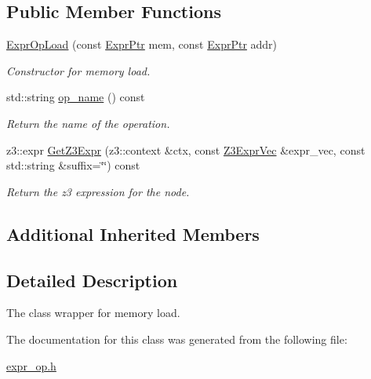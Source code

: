 \subsection*{Public Member Functions}
\begin{DoxyCompactItemize}
\item 
\mbox{\label{classilang_1_1_expr_op_load_ac7498e494eb3d11568e8ff2a7d3fc1ff}} 
\mbox{\hyperlink{classilang_1_1_expr_op_load_ac7498e494eb3d11568e8ff2a7d3fc1ff}{Expr\+Op\+Load}} (const \mbox{\hyperlink{classilang_1_1_expr_a85952b6a34620c4c8cab6bac9c9fdf8c}{Expr\+Ptr}} mem, const \mbox{\hyperlink{classilang_1_1_expr_a85952b6a34620c4c8cab6bac9c9fdf8c}{Expr\+Ptr}} addr)
\begin{DoxyCompactList}\small\item\em Constructor for memory load. \end{DoxyCompactList}\item 
\mbox{\label{classilang_1_1_expr_op_load_aa8b13ab857c69fa56660852b859d5ce4}} 
std\+::string \mbox{\hyperlink{classilang_1_1_expr_op_load_aa8b13ab857c69fa56660852b859d5ce4}{op\+\_\+name}} () const
\begin{DoxyCompactList}\small\item\em Return the name of the operation. \end{DoxyCompactList}\item 
\mbox{\label{classilang_1_1_expr_op_load_acfe4848a648ad1b1a5e7b014363e3e0e}} 
z3\+::expr \mbox{\hyperlink{classilang_1_1_expr_op_load_acfe4848a648ad1b1a5e7b014363e3e0e}{Get\+Z3\+Expr}} (z3\+::context \&ctx, const \mbox{\hyperlink{namespaceilang_adc4eee919aa24fff882d03a48d733c19}{Z3\+Expr\+Vec}} \&expr\+\_\+vec, const std\+::string \&suffix=\char`\"{}\char`\"{}) const
\begin{DoxyCompactList}\small\item\em Return the z3 expression for the node. \end{DoxyCompactList}\end{DoxyCompactItemize}
\subsection*{Additional Inherited Members}


\subsection{Detailed Description}
The class wrapper for memory load. 

The documentation for this class was generated from the following file\+:\begin{DoxyCompactItemize}
\item 
\mbox{\hyperlink{expr__op_8h}{expr\+\_\+op.\+h}}\end{DoxyCompactItemize}
